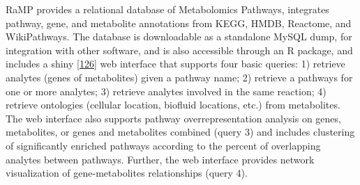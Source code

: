 \documentclass[]{article}
\begin{document}
RaMP provides a relational database of Metabolomics Pathways, integrates pathway, gene, and metabolite annotations from KEGG, HMDB, Reactome, and WikiPathways. The database is downloadable as a standalone MySQL dump, for integration with other software, and is also accessible through an R package, and includes a shiny {[}\protect\hyperlink{ref-chang_website_2012}{126}{]} web interface that supports four basic queries: 1) retrieve analytes (genes of metabolites) given a pathway name; 2) retrieve a pathways for one or more analytes; 3) retrieve analytes involved in the same reaction; 4) retrieve ontologies (cellular location, biofluid locations, etc.) from metabolites. The web interface also supports pathway overrepresentation analysis on genes, metabolites, or genes and metabolites combined (query 3) and includes clustering of significantly enriched pathways according to the percent of overlapping analytes between pathways. Further, the web interface provides network visualization of gene-metabolites relationships (query 4).
\end{document}
